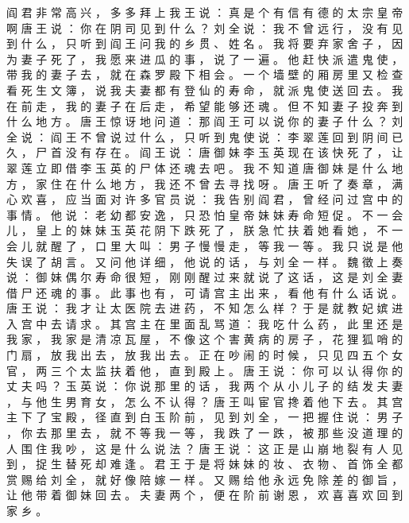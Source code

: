 {阎 君 非 常 高 兴 ， 多 多 拜 上 我 王 说 ： 真 是 个 有 信 有 德 的 太 宗 皇 帝 啊 唐 王 说 ： 你 在 阴 司 见 到 什 么 ？ 刘 全 说 ： 我 不 曾 远 行 ， 没 有 见 到 什 么 ， 只 听 到 阎 王 问 我 的 乡 贯 、 姓 名 。
我 将 要 弃 家 舍 子 ， 因 为 妻 子 死 了 ， 我 愿 来 进 瓜 的 事 ， 说 了 一 遍 。
他 赶 快 派 遣 鬼 使 ， 带 我 的 妻 子 去 ， 就 在 森 罗 殿 下 相 会 。
一 个 墙 壁 的 厢 房 里 又 检 查 看 死 生 文 簿 ， 说 我 夫 妻 都 有 登 仙 的 寿 命 ， 就 派 鬼 使 送 回 去 。
我 在 前 走 ， 我 的 妻 子 在 后 走 ， 希 望 能 够 还 魂 。
但 不 知 妻 子 投 奔 到 什 么 地 方 。
唐 王 惊 讶 地 问 道 ： 那 阎 王 可 以 说 你 的 妻 子 什 么 ？ 刘 全 说 ： 阎 王 不 曾 说 过 什 么 ， 只 听 到 鬼 使 说 ： 李 翠 莲 回 到 阴 间 已 久 ， 尸 首 没 有 存 在 。
阎 王 说 ： 唐 御 妹 李 玉 英 现 在 该 快 死 了 ， 让 翠 莲 立 即 借 李 玉 英 的 尸 体 还 魂 去 吧 。
我 不 知 道 唐 御 妹 是 什 么 地 方 ， 家 住 在 什 么 地 方 ， 我 还 不 曾 去 寻 找 呀 。
唐 王 听 了 奏 章 ， 满 心 欢 喜 ， 应 当 面 对 许 多 官 员 说 ： 我 告 别 阎 君 ， 曾 经 问 过 宫 中 的 事 情 。
他 说 ： 老 幼 都 安 逸 ， 只 恐 怕 皇 帝 妹 妹 寿 命 短 促 。
不 一 会 儿 ， 皇 上 的 妹 妹 玉 英 花 阴 下 跌 死 了 ， 朕 急 忙 扶 着 她 看 她 ， 不 一 会 儿 就 醒 了 ， 口 里 大 叫 ： 男 子 慢 慢 走 ， 等 我 一 等 。
我 只 说 是 他 失 误 了 胡 言 。
又 问 他 详 细 ， 他 说 的 话 ， 与 刘 全 一 样 。
魏 徵 上 奏 说 ： 御 妹 偶 尔 寿 命 很 短 ， 刚 刚 醒 过 来 就 说 了 这 话 ， 这 是 刘 全 妻 借 尸 还 魂 的 事 。
此 事 也 有 ， 可 请 宫 主 出 来 ， 看 他 有 什 么 话 说 。
唐 王 说 ： 我 才 让 太 医 院 去 进 药 ， 不 知 怎 么 样 ？
于 是 就 教 妃 嫔 进 入 宫 中 去 请 求 。
其 宫 主 在 里 面 乱 骂 道 ： 我 吃 什 么 药 ， 此 里 还 是 我 家 ， 我 家 是 清 凉 瓦 屋 ， 不 像 这 个 害 黄 病 的 房 子 ， 花 狸 狐 哨 的 门 扇 ， 放 我 出 去 ， 放 我 出 去 。 正 在 吵 闹 的 时 候 ， 只 见 四 五 个 女 官 ， 两 三 个 太 监 扶 着 他 ， 直 到 殿 上 。
唐 王 说 ： 你 可 以 认 得 你 的 丈 夫 吗 ？ 玉 英 说 ： 你 说 那 里 的 话 ， 我 两 个 从 小 儿 子 的 结 发 夫 妻 ， 与 他 生 男 育 女 ， 怎 么 不 认 得 ？ 唐 王 叫 宦 官 搀 着 他 下 去 。
其 宫 主 下 了 宝 殿 ， 径 直 到 白 玉 阶 前 ， 见 到 刘 全 ， 一 把 握 住 说 ： 男 子 ， 你 去 那 里 去 ， 就 不 等 我 一 等 ， 我 跌 了 一 跌 ， 被 那 些 没 道 理 的 人 围 住 我 吵 ， 这 是 什 么 说 法 ？
唐 王 说 ： 这 正 是 山 崩 地 裂 有 人 见 到 ， 捉 生 替 死 却 难 逢 。
君 王 于 是 将 妹 妹 的 妆 、 衣 物 、 首 饰 全 都 赏 赐 给 刘 全 ， 就 好 像 陪 嫁 一 样 。
又 赐 给 他 永 远 免 除 差 的 御 旨 ， 让 他 带 着 御 妹 回 去 。
夫 妻 两 个 ， 便 在 阶 前 谢 恩 ， 欢 喜 喜 欢 回 到 家 乡 。
}
